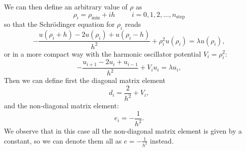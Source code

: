 \documentclass[11pt,a4wide]{article}
\begin{document}
We can then define an arbitrary value of $\rho$ as 
\[
    \rho_i= \rho_{\mathrm{min}} + ih \hspace{1cm} i=0,1,2,\dots , n_{\mathrm{step}}
\]
so that the Schr\"odinger equation for $\rho_i$ reads
\[
-\frac{u(\rho_i+h) -2u(\rho_i) +u(\rho_i-h)}{h^2}+\rho_i^2u(\rho_i)  = \lambda u(\rho_i),
\]
or in a more compact way with the harmonic oscillator potential $V_i=\rho_i^2$:
\begin{equation}
-\frac{u_{i+1} -2u_i +u_{i-1} }{h^2}+V_iu_i  = \lambda u_i,
\label{eq: sch_discrete_first}
\end{equation}
Then we can define first the diagonal matrix element
\[
   d_i=\frac{2}{h^2}+V_i,
\]
and the non-diagonal matrix element:
\[
   e_i=-\frac{1}{h^2}.
\]
We observe that in this case all the non-diagonal matrix element is given by a constant, so we can denote them all as $e=-\frac{1}{h^2}$ instead. 
 
\end{document}
